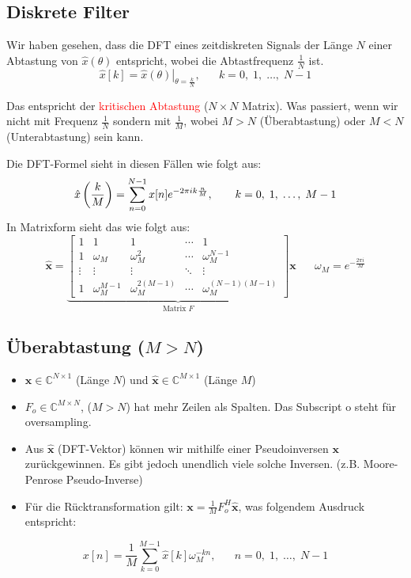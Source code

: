 \documentclass[11pt]{article}
\begin{document}
\subsection*{Diskrete Filter}

\pagebreak

Wir haben gesehen, dass die DFT eines zeitdiskreten Signals der Länge $N$ einer Abtastung von $\hat{x}(\theta)$ entspricht, wobei die Abtastfrequenz $\frac{1}{N}$ ist.
$$\hat{x}[k] = \left.\hat{x}(\theta)\right|_{\theta = \frac{k}{N}}, \hspace{20pt} k = 0, \; 1, \; \dots, \; N-1$$

Das entspricht der \textcolor{red}{kritischen Abtastung} ($N \times N$ Matrix). Was passiert, wenn wir nicht mit Frequenz $\frac{1}{N}$ sondern mit $\frac{1}{M}$, wobei $M > N$ (Überabtastung) oder $M < N$ (Unterabtastung) sein kann.

Die DFT-Formel sieht in diesen Fällen wie folgt aus:
\vspace*{-0.25cm}
$$\hat{x}\left(\frac{k}{M}\right) = \sum_{n=0}^{N-1}x[n]e^{-2 \pi i k \frac{n}{M}}, \hspace*{20pt} k = 0, \; 1, \; \dots, \; M-1$$
In Matrixform sieht das wie folgt aus:
$$\hat{\mathbf{x}} = \underbrace{\begin{bmatrix}
    1 & 1 & 1 & \cdots & 1 \\
    1 & \omega_M & \omega_M^2 & \cdots & \omega_M^{N-1} \\
    \vdots & \vdots & \vdots & \ddots & \vdots \\
    1 & \omega_M^{M-1} & \omega_M^{2(M-1)} & \cdots & \omega_M^{(N-1)(M-1)}
\end{bmatrix}}_{\text{Matrix }F} \mathbf{x} \hspace{20pt} \omega_M = e^{-\frac{2 \pi i}{M}}$$

\vspace*{-0.25cm}
\subsection*{Überabtastung ($M > N$)}
\vspace*{-0.5cm}
\begin{itemize}
    \item $\mathbf{x} \in \mathbb{C}^{N \times 1}$ (Länge $N$) und $\hat{\mathbf{x}} \in \mathbb{C}^{M \times 1}$ (Länge $M$)
    \item $F_o \in \mathbb{C}^{M\times N}$, ($M > N$) hat mehr Zeilen als Spalten. Das Subscript o steht für oversampling.
    \item Aus $\hat{\mathbf{x}}$ (DFT-Vektor) können wir mithilfe einer Pseudoinversen $\mathbf{x}$ zurückgewinnen. Es gibt jedoch unendlich viele solche Inversen. (z.B. Moore-Penrose Pseudo-Inverse)
    \item Für die Rücktransformation gilt: $\mathbf{x} = \displaystyle\frac{1}{M} F_o^H \hat{\mathbf{x}}$, was folgendem Ausdruck entspricht:
\end{itemize}
\vspace*{-0.5cm}
$$x[n] = \frac{1}{M} \sum_{k=0}^{M-1} \hat{x}[k]\omega_M^{-kn}, \hspace{20pt} n = 0, \; 1, \; \dots, \; N-1$$
\end{document}
